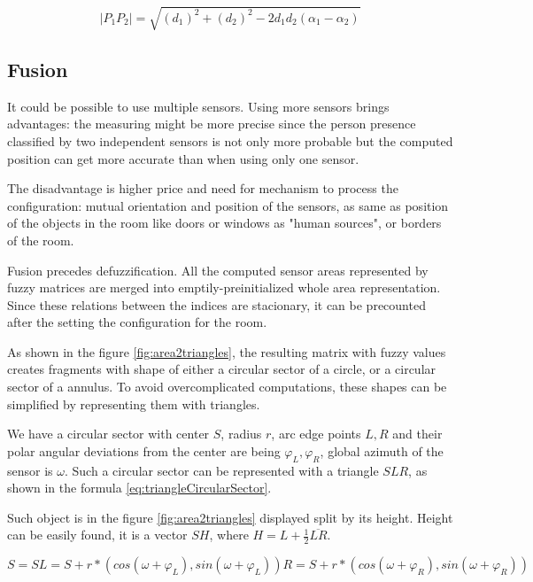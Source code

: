 \begin{equation}
|P_{1} P_{2}| = \sqrt{(d_{1})^{2} + (d_{2})^{2} - 2d_{1}d_{2}(\alpha_1 - \alpha_2)}
\end{equation}

\subsection*{Fusion}
It could be possible to use multiple sensors. Using more sensors brings advantages: the measuring
might be more precise since the person presence classified by two independent sensors is not only
more probable but the computed position can get more accurate than when using only one sensor.

The disadvantage is higher price and need for mechanism to process the configuration: mutual
orientation and position of the sensors, as same as position of the objects in the room
like doors or windows as "human sources", or borders of the room.

Fusion precedes defuzzification. All the computed sensor areas represented by fuzzy matrices
are merged into emptily-preinitialized whole area representation. Since these relations between
the indices are stacionary, it can be precounted after the setting the configuration for the room.

As shown in the figure \ref{fig:area2triangles}, the resulting matrix with fuzzy values
creates fragments with shape of either a circular sector of a circle, or a circular sector
of a annulus. To avoid overcomplicated computations, these shapes can be simplified by
representing them with triangles.

We have a circular sector with center $S$, radius $r$, arc edge points $L,R$ and their
polar angular deviations from the center are being $\varphi_L, \varphi_R$, global azimuth
of the sensor is $\omega$. Such a circular sector can be represented with a triangle $SLR$,
as shown in the formula \ref{eq:triangleCircularSector}.

Such object is in the figure \ref{fig:area2triangles} displayed split by its height.
Height can be easily found, it is a vector $SH$, where $H = L + \frac{1}{2}\overline{LR}$.

\begin{subequations}
\begin{equation}
S = S
\end{equation}
\begin{equation}
L = S + r*(cos(\omega + \varphi_L), sin(\omega + \varphi_L))
\end{equation}
\begin{equation}
R = S + r*(cos(\omega + \varphi_R), sin(\omega + \varphi_R))
\end{equation}
\label{eq:triangleCircularSector}
\end{subequations}

